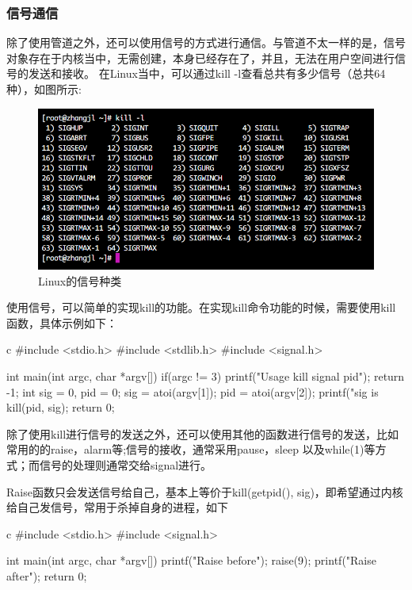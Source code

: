 \subsubsection{信号通信}
除了使用管道之外，还可以使用信号的方式进行通信。与管道不太一样的是，信号对象存在于内核当中，无需创建，本身已经存在了，并且，无法在用户空间进行信号的发送和接收。
在Linux当中，可以通过kill -l查看总共有多少信号（总共64种），如图所示:
\begin{figure}[H]
  \centering
  \includegraphics[width=\linewidth]{signal.png}
  \caption{Linux的信号种类}
  \label{fig:signal}
\end{figure}

使用信号，可以简单的实现kill的功能。在实现kill命令功能的时候，需要使用kill函数，具体示例如下：
\begin{code-block}{c}
#include <stdio.h>
#include <stdlib.h>
#include <signal.h>

int main(int argc, char *argv[])
{
        if(argc != 3)
        {
                printf("Usage kill signal pid\n");
                return -1;
        }
        int sig = 0, pid = 0;
        sig = atoi(argv[1]);
        pid = atoi(argv[2]);
        printf("sig is %
        kill(pid, sig);
        return 0;
}
\end{code-block}

除了使用kill进行信号的发送之外，还可以使用其他的函数进行信号的发送，比如常用的的raise，alarm等;信号的接收，通常采用pause，sleep
以及while(1)等方式；而信号的处理则通常交给signal进行。

Raise函数只会发送信号给自己，基本上等价于kill(getpid(), sig)，即希望通过内核给自己发信号，常用于杀掉自身的进程，如下
\begin{code-block}{c}
#include <stdio.h>
#include <signal.h>

int main(int argc, char *argv[])
{
        printf("Raise before\n");
        raise(9);
        printf("Raise after\n");
        return 0;
}
\end{code-block}

